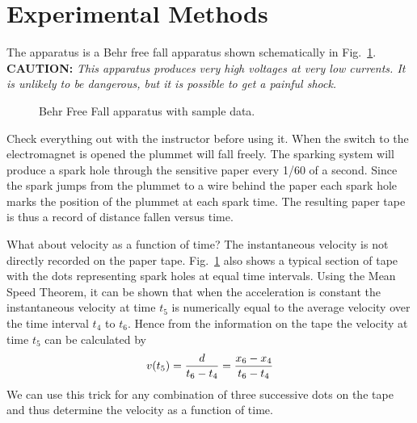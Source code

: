 \section*{Experimental Methods}
     The apparatus is a Behr free fall apparatus shown
schematically in Fig.~\ref{fig:behr}.  {\bf CAUTION:} {\em This apparatus
produces very high voltages at very low currents.  It is unlikely to
be dangerous, but it is possible to get a painful shock.}
\begin{figure}
\begin{center}
{}
\end{center}
 \caption{Behr Free Fall apparatus with sample data.  \label{fig:behr}}
\end{figure}
Check everything out with the instructor before using it.  When the switch to
the electromagnet is opened the plummet will fall freely.  The sparking system
will produce a spark hole through the sensitive paper every 1/60 of a second.
Since the spark jumps from the plummet to a wire behind the paper each spark hole marks
the position of the plummet at each spark time.  The resulting paper tape is thus a
record of distance fallen versus time.

What about velocity as a function of time?  The instantaneous velocity is not
directly recorded on the paper tape.  Fig.~\ref{fig:behr} also shows a typical
section of tape with the dots representing spark holes at equal time intervals.
Using the Mean Speed Theorem, it can be shown that when the
acceleration is constant the instantaneous velocity at time $t_{5}$ is
numerically equal to the average velocity over the time interval $t_{4}$ to
$t_{6}$.  Hence from the information on the tape the velocity at time $t_{5}$
can be calculated by
\[
v(t_{5}) = {{d} \over {t_{6} - t_{4}}} = {x_6-x_4 \over t_{6} - t_{4}}
\]
We can use this trick for any combination of three successive dots on the tape
and thus determine the velocity as a function of time.

